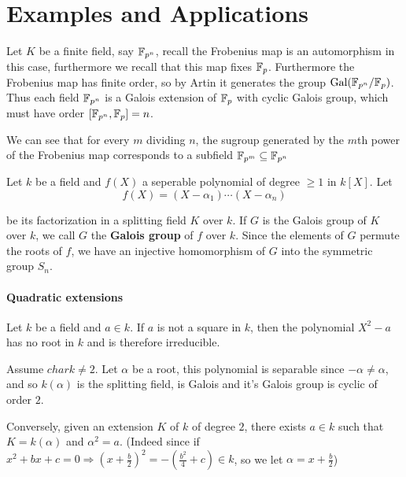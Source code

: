   \section{Examples and Applications}
  \begin{bergman}
    Let $K$ be a finite field, say $\mathbb{F}_{p^n}$, recall the Frobenius map is an automorphism in this case, furthermore we recall that this map fixes $\mathbb{F}_p$. Furthermore the Frobenius map has finite order, so by Artin
    it generates the group $\text{Gal}(\mathbb{F}_{p^n}/\mathbb{F}_{p})$. Thus each field $\mathbb{F}_{p^n}$ is a Galois extension of $\mathbb{F}_{p}$ with cyclic Galois group, which must have order $[\mathbb{F}_{p^n}, \mathbb{F}_{p}] = n$.

    We can see that for every $m$ dividing $n$, the sugroup generated by the $m$th power of the Frobenius map corresponds to a subfield $\mathbb{F}_{p^m}\subseteq \mathbb{F}_{p^n}$ 
  \end{bergman}
  
  \begin{definition}
    Let $k$ be a field and $f(X)$ a seperable polynomial of degree $\geq 1$ in $k[X]$. Let \[
        f(X) = (X-\alpha_1)\cdots (X-\alpha_n)  
    \]

    be its factorization in a splitting field $K$ over $k$. If $G$ is the Galois group of $K$ over $k$, we call $G$ the \textbf{Galois group} of $f$ over $k$. 
    Since the elements of $G$ permute the roots of $f$, we have an injective homomorphism of $G$ into the symmetric group $S_n$. 
  \end{definition}
  \paragraph*{Quadratic extensions}
  \begin{example}
    Let $k$ be a field and $a\in k$. If $a$ is not a square in $k$, then the polynomial $X^2-a$ has no root in $k$ and is therefore irreducible.
  
    Assume $char k\neq 2$. Let $\alpha$ be a root, this polynomial is separable since $-\alpha\neq \alpha$, and so $k(\alpha)$ is the splitting field, is Galois and it's Galois group is cyclic of order $2$.
  
    Conversely, given an extension $K$ of $k$ of degree $2$, there exists $a\in k$ such that $K = k(\alpha)$ and $\alpha^2 = a$. (Indeed since if $x^2 + bx + c = 0\Rightarrow {(x + \frac{b}{2})}^2 = -(\frac{b^2}{4} + c)\in k$, so we let $\alpha = x + \frac{b}{2}$)
  \end{example}

